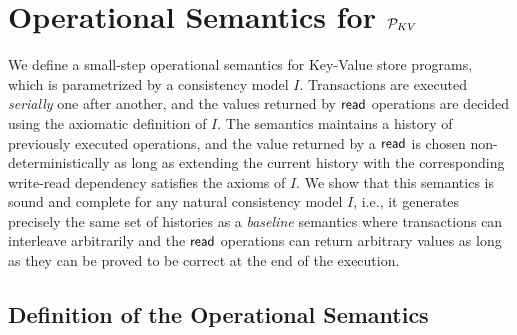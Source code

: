 
\section{Operational Semantics for \texorpdfstring{$\mathcal{P}_{KV}$}{𝓟ₖᵥ}}
\label{sec:op-kv}

We define a small-step operational semantics for Key-Value store programs, which is parametrized by a consistency model $I$. Transactions are executed \emph{serially} one after another, and the values returned by $\textsf{read}$ operations are decided using the axiomatic definition of $I$. The semantics maintains a history of previously executed operations, and the value returned by a $\textsf{read}$ is chosen non-deterministically as long as extending the current history with the corresponding write-read dependency satisfies the axioms of $I$. 
We show that this semantics is sound and complete for any natural consistency model $I$, i.e., it generates precisely the same set of histories as a \emph{baseline} semantics where transactions can interleave arbitrarily and the $\textsf{read}$ operations can return arbitrary values as long as they can be proved to be correct at the end of the execution.

\subsection{Definition of the Operational Semantics}


